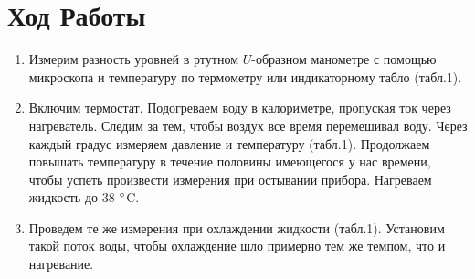\documentclass[a4paper,12pt]{article} %
\begin{document}
	\section*{Ход Работы}
	\begin{enumerate}
		\item Измерим разность уровней в ртутном $U$-образном манометре с помощью микроскопа и температуру по термометру или индикаторному табло (табл.1).
		
		\item Включим термостат. Подогреваем воду в калориметре, пропуская ток через нагреватель. Следим за тем, чтобы воздух все время перемешивал воду. Через каждый градус измеряем давление и температуру (табл.1). Продолжаем повышать температуру в течение половины имеющегося у нас времени, чтобы успеть произвести измерения при остывании прибора. Нагреваем жидкость до 38 $\degree$C.
		
		\item Проведем те же измерения при охлаждении жидкости (табл.1). Установим такой поток воды, чтобы охлаждение шло примерно тем же темпом, что и нагревание.

		
		

\end{enumerate}
\end{document}
